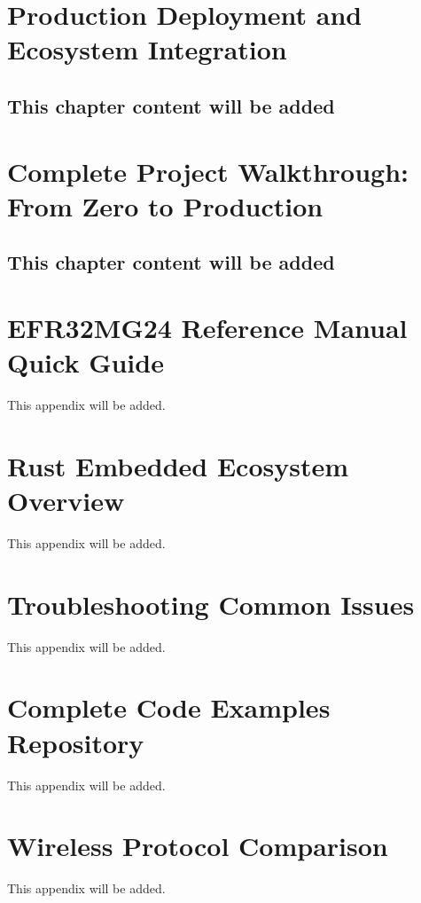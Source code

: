 \documentclass[11pt,a4paper,twoside,openright]{book}
\begin{document}
\chapter{Production Deployment and Ecosystem Integration}
\label{ch:chapter-17}
\section*{This chapter content will be added}
\clearpage

\chapter{Complete Project Walkthrough: From Zero to Production}
\label{ch:chapter-18}
\section*{This chapter content will be added}
\clearpage

\appendix

\chapter{EFR32MG24 Reference Manual Quick Guide}
\label{ap:appendix-a}
This appendix will be added.
\clearpage

\chapter{Rust Embedded Ecosystem Overview}
\label{ap:appendix-b}
This appendix will be added.
\clearpage

\chapter{Troubleshooting Common Issues}
\label{ap:appendix-c}
This appendix will be added.
\clearpage

\chapter{Complete Code Examples Repository}
\label{ap:appendix-d}
This appendix will be added.
\clearpage

\chapter{Wireless Protocol Comparison}
\label{ap:appendix-e}
This appendix will be added.
\clearpage
\end{document}
